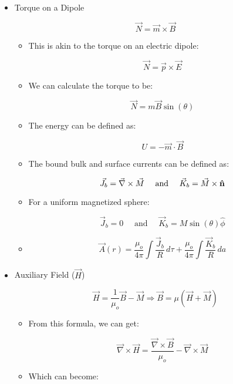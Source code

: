 \begin{itemize}

  \item Torque on a Dipole

    $$\vec{N}=\vec{m}\times\vec{B}$$

    \begin{itemize}

      \item This is akin to the torque on an electric dipole:

        $$\vec{N}=\vec{p}\times\vec{E}$$

      \item We can calculate the torque to be:

        $$\vec{N}=m\vec{B}\sin(\theta)$$

      \item The energy can be defined as:

        $$U=-\vec{m}\cdot\vec{B}$$

      \item The bound bulk and surface currents can be defined as:

        $$\vec{J}_b=\vec{\nabla}\times\vec{M}\quad\text{ and }\quad\vec{K}_b=\vec{M}\times\bold{\hat{n}}$$

      \item For a uniform magnetized sphere:

        $$\vec{J}_b=0\quad\text{ and }\quad\vec{K}_b=M\sin(\theta)\hat{\phi}$$

      \item

        $$\vec{A}(r)=\frac{\mu_o}{4\pi}\int\frac{\vec{J}_b}{R}\,d\tau+\frac{\mu_o}{4\pi}\int\frac{\vec{K}_b}{R}\,da$$

    \end{itemize}

  \item Auxiliary Field ($\vec{H}$)

    $$\vec{H}=\frac{1}{\mu_o}\vec{B}-\vec{M}\Rightarrow \vec{B}=\mu(\vec{H}+\vec{M})$$

    \begin{itemize}

      \item From this formula, we can get:

        $$\vec{\nabla}\times\vec{H}=\frac{\vec{\nabla}\times\vec{B}}{\mu_o}-\vec{\nabla}\times\vec{M}$$

      \item Which can become:


\end{itemize}
\end{itemize}
